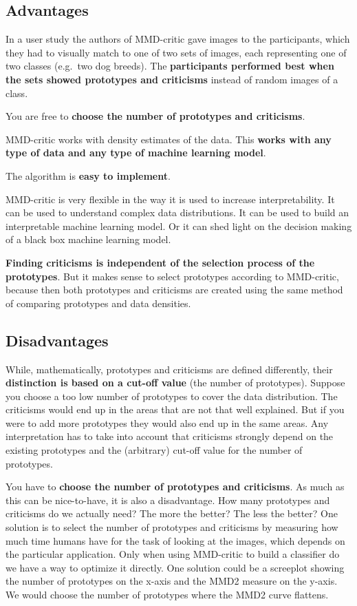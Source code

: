 \documentclass[
  11pt,
]{scrbook}
\begin{document}
\hypertarget{advantages-11}{%
\subsection{Advantages}\label{advantages-11}}

In a user study the authors of MMD-critic gave images to the participants, which they had to visually match to one of two sets of images, each representing one of two classes (e.g.~two dog breeds).
The \textbf{participants performed best when the sets showed prototypes and criticisms} instead of random images of a class.

You are free to \textbf{choose the number of prototypes and criticisms}.

MMD-critic works with density estimates of the data.
This \textbf{works with any type of data and any type of machine learning model}.

The algorithm is \textbf{easy to implement}.

MMD-critic is very flexible in the way it is used to increase interpretability.
It can be used to understand complex data distributions.
It can be used to build an interpretable machine learning model.
Or it can shed light on the decision making of a black box machine learning model.

\textbf{Finding criticisms is independent of the selection process of the prototypes}.
But it makes sense to select prototypes according to MMD-critic, because then both prototypes and criticisms are created using the same method of comparing prototypes and data densities.

\hypertarget{disadvantages-11}{%
\subsection{Disadvantages}\label{disadvantages-11}}

While, mathematically, prototypes and criticisms are defined differently, their \textbf{distinction is based on a cut-off value} (the number of prototypes).
Suppose you choose a too low number of prototypes to cover the data distribution.
The criticisms would end up in the areas that are not that well explained.
But if you were to add more prototypes they would also end up in the same areas.
Any interpretation has to take into account that criticisms strongly depend on the existing prototypes and the (arbitrary) cut-off value for the number of prototypes.

You have to \textbf{choose the number of prototypes and criticisms}.
As much as this can be nice-to-have, it is also a disadvantage.
How many prototypes and criticisms do we actually need?
The more the better? The less the better?
One solution is to select the number of prototypes and criticisms by measuring how much time humans have for the task of looking at the images, which depends on the particular application.
Only when using MMD-critic to build a classifier do we have a way to optimize it directly.
One solution could be a screeplot showing the number of prototypes on the x-axis and the MMD2 measure on the y-axis.
We would choose the number of prototypes where the MMD2 curve flattens.
\end{document}
